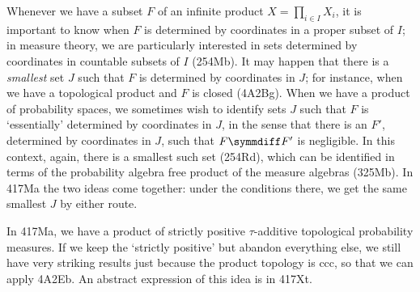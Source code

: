 {Whenever we have a subset $F$ of an infinite product
$X=\prod_{i\in I}X_i$, it is important to know when $F$ is determined by
coordinates in a proper subset of $I$;  in measure theory, we are
particularly interested in sets determined by coordinates in countable
subsets of $I$ (254Mb).   It may happen that there is a {\it smallest}
set $J$ such that $F$ is determined by coordinates in $J$;  for
instance, when we have a topological product and $F$ is closed (4A2Bg).
When we have a product of probability spaces, we sometimes wish to
identify sets $J$ such that $F$ is `essentially' determined by
coordinates in $J$, in the sense that there is an $F'$, determined
by coordinates in $J$, such that $F\symmdiff F'$ is negligible.   In
this context, again, there is a smallest such set (254Rd), which can be
identified in terms of the probability algebra free product of the
measure algebras (325Mb).   In 417Ma the two ideas come together:  under
the conditions there, we get the same smallest $J$ by either route.

In 417Ma, we have a product of strictly positive $\tau$-additive
topological probability measures.   If we keep the `strictly positive'
but abandon everything else, we still have very striking results just
because the product topology is ccc, so that we can apply 4A2Eb.   An
abstract expression of this idea is in 417Xt.
}%

\discrpage

